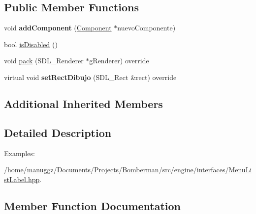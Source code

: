 \subsection*{Public Member Functions}
\begin{DoxyCompactItemize}
\item 
void {\bfseries add\+Component} (\hyperlink{class_component}{Component} $\ast$nuevo\+Componente)\hypertarget{class_layout_vertical_a3d675e4ba5f0e1c45b78a8191eaf3b15}{}\label{class_layout_vertical_a3d675e4ba5f0e1c45b78a8191eaf3b15}

\item 
bool \hyperlink{class_layout_vertical_a90f1b16b40a8765bb59d536b667e13e4}{is\+Disabled} ()
\item 
void \hyperlink{class_layout_vertical_a02eea5b9dd8197100d964d0e6f33e208}{pack} (S\+D\+L\+\_\+\+Renderer $\ast$g\+Renderer) override
\item 
virtual void {\bfseries set\+Rect\+Dibujo} (S\+D\+L\+\_\+\+Rect \&rect) override\hypertarget{class_layout_vertical_a08fbc2283e2cb2c42c806fe21f64a0ac}{}\label{class_layout_vertical_a08fbc2283e2cb2c42c806fe21f64a0ac}

\end{DoxyCompactItemize}
\subsection*{Additional Inherited Members}


\subsection{Detailed Description}
\begin{Desc}
\item[Examples\+: ]\par
\hyperlink{_2home_2manuggz_2_documents_2_projects_2_bomberman_2src_2engine_2interfaces_2_menu_list_label_8hpp-example}{/home/manuggz/\+Documents/\+Projects/\+Bomberman/src/engine/interfaces/\+Menu\+List\+Label.\+hpp}.\end{Desc}


\subsection{Member Function Documentation}
